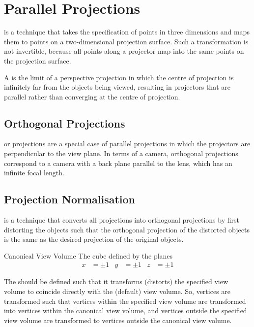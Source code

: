\documentclass[../COS3712_Notes.tex]{subfiles}
\begin{document}
    \section{Parallel Projections}
       is a technique that takes the specification of points in
      three dimensions and maps them to points on a two-dimensional projection surface.
      Such a transformation is not invertible, because all points along a projector
      map into the same points on the projection surface.

      A  is the limit of a perspective projection in which the
      centre of projection is infinitely far from the objects being viewed,
      resulting in projectors that are parallel rather than converging at the centre of projection.

      \subsection{Orthogonal Projections}
         or  projections are a special case
        of parallel projections in which the projectors are perpendicular to the view plane.
        In terms of a camera, orthogonal projections correspond to a camera with a back plane
        parallel to the lens, which has an infinite focal length.

      \subsection{Projection Normalisation}
         is a technique that converts all projections
        into orthogonal projections by first distorting the objects such that the
        orthogonal projection of the distorted objects is the same as the desired projection
        of the original objects.

        \begin{definition}{Canonical View Volume}
          The cube defined by the planes
          \begin{align*}
            x &= \pm 1 & y &= \pm 1 & z &= \pm 1
          \end{align*}
        \end{definition}

        The  should be defined such that it transforms (distorts)
        the specified view volume to coincide directly with the  (default)
        view volume.
        So, vertices are transformed such that vertices within the specified view volume
        are transformed into vertices within the canonical view volume,
        and vertices outside the specified view volume are transformed to vertices outside
        the canonical view volume.
\end{document}
